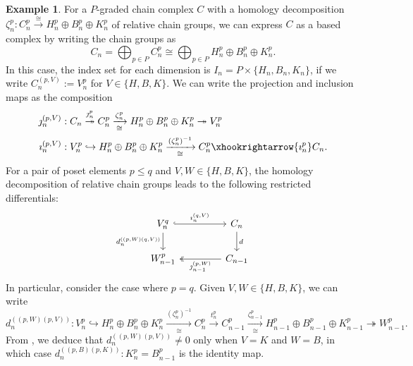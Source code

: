 \documentclass[11pt, table, nothms]{amsart}
\theoremstyle{definition}
\newtheorem{example}[theorem]{Example}
\begin{document}
{\begin{example} \label{ex:Pfiltbased}
    For a $P$-graded chain complex $C$ with a homology decomposition $\zeta^p_n: C^p_n \xrightarrow{\cong} H^p_n \oplus B^p_n \oplus K^p_n$ of relative chain groups, we can express $C$ as a based complex by writing the chain groups as 
    \[C_n =  \bigoplus_{p \in P} C^p_n \cong  \bigoplus_{p \in P} H^p_n \oplus B^p_n \oplus K^p_n.\] 
    In this case, the index set for each dimension is $I_n =P \times \{H_n, B_n,K_n
    \} $, if we write $C_n^{(p, V)} := V_n^p$ for $V \in \{H, B,K
    \}$. We can write the projection and inclusion maps as the composition 
    \begin{align*}
        \jmath_n^{(p,V)} &: C_n \overset{\jmath^p_n}{\twoheadrightarrow} C^p_n \xrightarrow[\cong]{\zeta^p_n} H^p_n \oplus B^p_n \oplus K^p_n \twoheadrightarrow V^p_n  \\ \imath_n^{(p,V)}&: V^p_n \hookrightarrow H^p_n \oplus B^p_n \oplus K^p_n \xrightarrow[\cong]{(\zeta^p_n)^{-1}}C^p_n  \xhookrightarrow{\imath^p_n} C_n .
    \end{align*}
    For a pair of poset elements $p \leq q$ and $V,W \in \{H, B, K\}$, the homology decomposition of relative chain groups leads to the following restricted differentials:
\[
\begin{tikzcd}[column sep=1.5cm,
/tikz/column 2/.style={column sep=-0.5em},
/tikz/column 3/.style={column sep=-0.5em},
/tikz/column 4/.style={column sep=-0.5em},
/tikz/column 5/.style={column sep=-0.5em}]
    V^q_n \ar[d, "d_n^{((p,W)(q,V))}", swap] 
    \ar[r, hookrightarrow, "\imath_n^{(q,V)}"] 
    &
    C_n \ar[d, "d"]
    \\
    W^p_{n-1} &
    C_{n-1} \ar[l,twoheadrightarrow, "\jmath^{(p,W)}_{n-1}"] 
\end{tikzcd}
\]
In particular, consider the case where $p=q$. 
Given $V,W \in \{H,B,K\}$, we can write  
\begin{equation*}
    d_n^{((p,W)(p,V))}: V^p_n \hookrightarrow H^p_n \oplus B^p_n \oplus K^p_n \xrightarrow[\cong]{(\zeta^p_n)^{-1}} C^p_n \xrightarrow{t^{p}_n} C^p_{n-1}  \xrightarrow[\cong]{\zeta^p_{n-1}} H^p_{n-1} \oplus B^p_{n-1} \oplus K^p_{n-1} \twoheadrightarrow W^p_{n-1}.
\end{equation*}
From , 
we deduce that $d_n^{((p,W)(p,V))}\neq 0$ only 
when $V = K$ and $W = B$, in which case $d_n^{((p,B)(p,K))}: K_n^p = B_{n-1}^p$ is the identity map.
\end{example}

}
\end{document}

